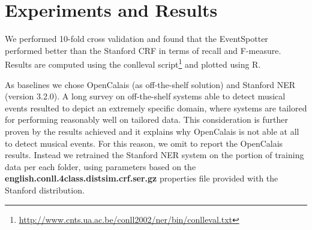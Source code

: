 \documentclass[10pt,a4paper]{article}
\begin{document}
{\color{red}{A+M: *URGENT* create a table with the stats of the dataset, i.e. number of token etc. etc.}}

\section{Experiments and Results}
We performed 10-fold cross validation and found that the EventSpotter performed better than the Stanford CRF in terms of recall and F-measure. Results are computed using the conlleval script\footnote{\url{http://www.cnts.ua.ac.be/conll2002/ner/bin/conlleval.txt}} and plotted using R.

As baselines we chose OpenCalais (as off-the-shelf solution) and Stanford NER (version 3.2.0).
A long survey on off-the-shelf systems able to detect musical events resulted to depict an extremely specific domain, where systems are tailored for performing reasonably well on tailored data. This consideration is further proven by the results achieved and it explains why OpenCalais is not able at all to detect musical events. For this reason, we omit to report the OpenCalais results.
Instead we retrained the Stanford NER system on the portion of training data per each folder, using parameters based on the \textbf{english.conll.4class.distsim.crf.ser.gz} properties file provided with the Stanford distribution.

\end{document}
